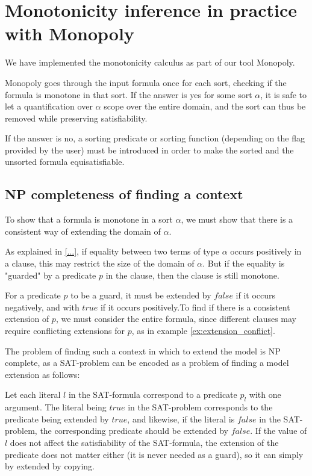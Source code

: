 \section{Monotonicity inference in practice with Monopoly}


We have implemented the monotonicity calculus as part of our tool
Monopoly.

Monopoly goes through the input formula once for each sort, checking if
the formula is monotone in that sort. If the answer is yes for some sort $\alpha$,
it is safe to let a quantification over $\alpha$ scope over the entire domain,
and the sort can thus be removed while preserving satisfiability. 

If the answer is no, a sorting predicate or sorting function (depending on the
flag provided by the user) must be introduced in order to make the sorted and the 
unsorted formula equisatisfiable.
 
\subsection{NP completeness of finding a context}

  To show that a formula is monotone in a sort $\alpha$, we must show that there is
  a consistent way of extending the domain of $\alpha$. 

  As explained in \ref{...}, if equality between two terms of type $\alpha$ occurs 
  positively in a clause, this may restrict the size of the domain of $\alpha$. But if 
  the equality is "guarded" by a predicate $p$ in the clause, then the clause is still monotone.

  For a predicate $p$ to be a guard, it must be extended by $false$ if it occurs negatively,
  and with $true$ if it occurs positively.To find if there is a consistent extension of $p$, 
  we must consider the entire formula, since different clauses may require conflicting 
  extensions for $p$, as in example \ref{ex:extension_conflict}.

  The problem of finding such a context in which to extend the model is NP complete, as a SAT-problem can be 
  encoded as a problem of finding a model extension as follows:

  Let each literal $l$ in the SAT-formula correspond to a predicate $p_l$ with one argument.
  The literal being $true$ in the SAT-problem corresponds to the predicate
  being extended by $true$, and likewise, if the literal is $false$ in the SAT-
  problem, the corresponding predicate should be extended by $false$. If the value of $l$ does
  not affect the satisfiability of the SAT-formula, the extension of the predicate does not
  matter either (it is never needed as a guard), so it can simply by extended by copying. 

